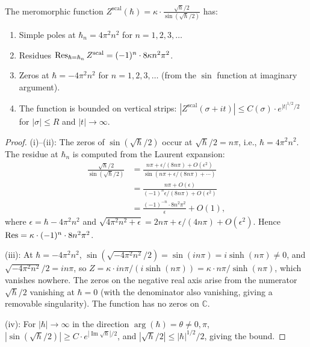 \begin{proposition}
The meromorphic function $Z^{\mathrm{scal}}(\hbar) = \kappa \cdot \frac{\sqrt{\hbar}/2}{\sin(\sqrt{\hbar}/2)}$ has:
\begin{enumerate}[label=\textup{(\roman*)}]
\item Simple poles at $\hbar_n = 4\pi^2 n^2$ for $n = 1, 2, 3, \ldots$
\item Residues $\operatorname{Res}_{\hbar = \hbar_n} Z^{\mathrm{scal}} = (-1)^{n} \cdot 8\kappa n^2\pi^2$.
\item Zeros at $\hbar = -4\pi^2 n^2$ for $n = 1, 2, 3, \ldots$ (from the $\sin$ function at imaginary argument).
\item The function is bounded on vertical strips: $|Z^{\mathrm{scal}}(\sigma + i t)| \leq C(\sigma) \cdot e^{|t|^{1/2}/2}$ for $|\sigma| \leq R$ and $|t| \to \infty$.
\end{enumerate}
\end{proposition}

\begin{proof}
(i)--(ii): The zeros of $\sin(\sqrt{\hbar}/2)$ occur at $\sqrt{\hbar}/2 = n\pi$, i.e., $\hbar = 4\pi^2 n^2$. The residue at $\hbar_n$ is computed from the Laurent expansion:
\begin{align*}
\frac{\sqrt{\hbar}/2}{\sin(\sqrt{\hbar}/2)} &= \frac{n\pi + \epsilon/(8n\pi) + O(\epsilon^2)}{\sin(n\pi + \epsilon/(8n\pi) + \cdots)} \\
&= \frac{n\pi + O(\epsilon)}{(-1)^n \epsilon/(8n\pi) + O(\epsilon^2)} \\
&= \frac{(-1)^{-n} \cdot 8n^2\pi^2}{\epsilon} + O(1),
\end{align*}
where $\epsilon = \hbar - 4\pi^2 n^2$ and
$\sqrt{4\pi^2 n^2 + \epsilon} = 2n\pi + \epsilon/(4n\pi) + O(\epsilon^2)$.
Hence $\operatorname{Res} = \kappa \cdot (-1)^{n} \cdot 8n^2\pi^2$.

(iii): At $\hbar = -4\pi^2 n^2$, $\sin(\sqrt{-4\pi^2 n^2}/2) = \sin(i n\pi) = i\sinh(n\pi) \neq 0$, and $\sqrt{-4\pi^2 n^2}/2 = i n\pi$, so $Z = \kappa \cdot in\pi / (i\sinh(n\pi)) = \kappa \cdot n\pi/\sinh(n\pi)$, which vanishes nowhere. The zeros on the negative real axis arise from the numerator $\sqrt{\hbar}/2$ vanishing at $\hbar = 0$ (with the denominator also vanishing, giving a removable singularity). The function has no zeros on $\mathbb{C}$.

(iv): For $|\hbar| \to \infty$ in the direction $\arg(\hbar) = \theta \neq 0, \pi$, $|\sin(\sqrt{\hbar}/2)| \geq C \cdot e^{|\operatorname{Im}\sqrt{\hbar}|/2}$, and $|\sqrt{\hbar}/2| \leq |\hbar|^{1/2}/2$, giving the bound.
\end{proof}


